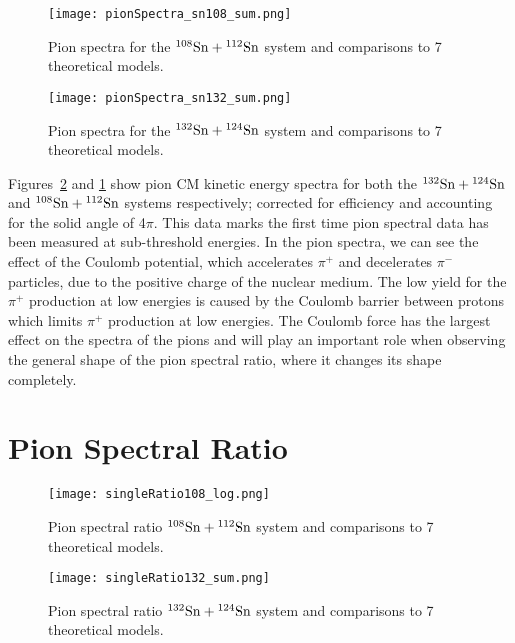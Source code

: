 \begin{figure}[!htb]
\centering
\texttt{[image: pionSpectra\_sn108\_sum.png]}
\caption{Pion spectra for the ${}^{108}\mathrm{Sn} + {}^{112}\mathrm{Sn}$ system and comparisons to 7 theoretical models. }
\label{fig:pionspectraSn108}
\end{figure}


\begin{figure}[!htb]
\centering
\texttt{[image: pionSpectra\_sn132\_sum.png]}
\caption{Pion spectra for the ${}^{132}\mathrm{Sn} + {}^{124}\mathrm{Sn}$ system and comparisons to 7 theoretical models. }
\label{fig:pionspectraSn132}
\end{figure}


Figures~\ref{fig:pionspectraSn132} and \ref{fig:pionspectraSn108} show pion CM kinetic energy spectra for both the ${}^{132}\mathrm{Sn} + {}^{124}\mathrm{Sn}$ and ${}^{108}\mathrm{Sn} + {}^{112}\mathrm{Sn}$ systems respectively; corrected for efficiency and accounting for the solid angle of 4$\pi$. This data marks the first time pion spectral data has been measured at sub-threshold energies. In the pion spectra, we can see the effect of the Coulomb potential, which accelerates $\pi^+$ and decelerates $\pi^-$ particles, due to the positive charge of the nuclear medium. The low yield for the $\pi^+$ production at low energies is caused by the Coulomb barrier between protons which limits $\pi^+$ production at low energies. The Coulomb force has the largest effect on the spectra of the pions and will play an important role when observing the general shape of the pion spectral ratio, where it changes its shape completely. 



\section{Pion Spectral Ratio}

\begin{figure}[!htb]
\centering
\texttt{[image: singleRatio108\_log.png]}
\caption{Pion spectral ratio ${}^{108}\mathrm{Sn} + {}^{112}\mathrm{Sn}$ system and comparisons to 7 theoretical models.}
\label{fig:SRsn108}
\end{figure}

\begin{figure}[!htb]
\centering
\texttt{[image: singleRatio132\_sum.png]}
\caption{Pion spectral ratio ${}^{132}\mathrm{Sn} + {}^{124}\mathrm{Sn}$ system and comparisons to 7 theoretical models.}
\label{fig:SRsn132}
\end{figure}

